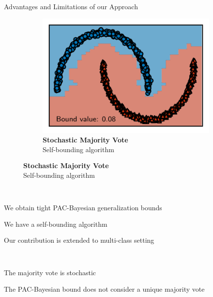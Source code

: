 \documentclass{slides}
\begin{document}
\begin{xframe}{Advantages and Limitations of our Approach}
\begin{center}
{\begin{figure}
\begin{subfigure}{0.32\textwidth}
\end{subfigure}
\hfill
\begin{subfigure}{0.32\textwidth}
    \includegraphics[width=\textwidth]{figures/moons_ours.pdf}
    \caption{{\bf Stochastic Majority Vote}\\ Self-bounding algorithm}
\end{subfigure}
\end{figure}
}
\end{center}

\vspace{-0.6cm}

\\[0.1cm] 
\begin{xitemize}
    \item[\green{\bf +}] We obtain tight PAC-Bayesian generalization bounds
    \item[\green{\bf +}] We have a self-bounding algorithm
    \item[\green{\bf +}] Our contribution is extended to multi-class setting
\end{xitemize}

\vspace{0.2cm}

\\[0.1cm]
\begin{xitemize}
    \item[\red{\bf --} ] The majority vote is stochastic
    \item[\red{$\Rightarrow$}] The PAC-Bayesian bound does not consider a unique majority vote
\end{xitemize}

\vfill

\end{xframe}
\end{document}
